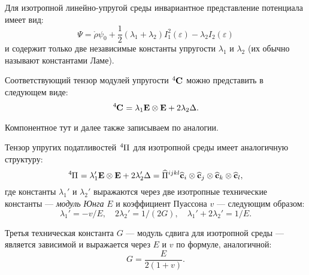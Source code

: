 
Для изотропной линейно-упругой среды инвариантное представление потенциала имеет вид:
\begin{equation}
	\Psi = \mathring{\rho} \psi_0 + \frac{1}{2} \left(\lambda_1 + \lambda_2\right) I^2_1(\varepsilon) - \lambda_2 I_2(\varepsilon)
\end{equation}
и содержит только две независимые константы упругости $\lambda_1$ и $\lambda_2$ (их обычно называют константами Ламе). 

Соответствующий тензор модулей упругости $\tensor[^4]{\mathbf{C}}{}$ можно представить в следующем виде:
\begin{equation}
	\tensor[^4]{\mathbf{C}}{} = \lambda_1 \mathbf{E} \otimes \mathbf{E} + 2 \lambda_2 \Delta.
\end{equation}

Компонентное тут и далее также записываем по аналогии.

Тензор упругих податливостей $\tensor[^4]{\Pi}{}$ для изотропной среды имеет аналогичную структуру:
\begin{equation}
	\tensor[^4]{\Pi}{} = \lambda'_1 \mathbf{E} \otimes \mathbf{E} + 2 \lambda_2' \Delta = \widehat{\Pi}^{ijkl} \widehat{\mathbf{c}}_i \otimes \widehat{\mathbf{c}}_j \otimes \widehat{\mathbf{c}}_k \otimes \widehat{\mathbf{c}}_l,
\end{equation}
где константы $\lambda_1'$ и $\lambda_2'$ выражаются через две изотропные технические константы --- \textit{модуль Юнга} $E$ и коэффициент Пуассона $v$ --- следующим образом:
\begin{equation}
	\lambda_1' = - v/E, \quad 2 \lambda_2' = 1/\left(2G\right), \quad \lambda_1' + 2 \lambda_2' = 1/E.
\end{equation}

Третья техническая константа $G$ --- модуль сдвига для изотропной среды --- является зависимой и выражается через $E$ и $v$ по формуле, аналогичной:
\begin{equation}
	G = \frac{E}{2(1 + v)}.
\end{equation}

